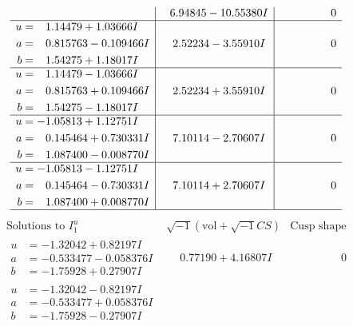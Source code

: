 \documentclass[1p]{elsarticle_modified}
\theoremstyle{definition}
\newcommand{\I}{\sqrt{-1}}
\begin{document}
$$\begin{array}{c|c|c}
 & \phantom{-}6.94845 - 10.55380 I & \phantom{-0.000000 } 0 \\ \hline\begin{aligned}
u &= \phantom{-}1.14479 + 1.03666 I \\
a &= \phantom{-}0.815763 - 0.109466 I \\
b &= \phantom{-}1.54275 + 1.18017 I\end{aligned}
 & \phantom{-}2.52234 - 3.55910 I & \phantom{-0.000000 } 0 \\ \hline\begin{aligned}
u &= \phantom{-}1.14479 - 1.03666 I \\
a &= \phantom{-}0.815763 + 0.109466 I \\
b &= \phantom{-}1.54275 - 1.18017 I\end{aligned}
 & \phantom{-}2.52234 + 3.55910 I & \phantom{-0.000000 } 0 \\ \hline\begin{aligned}
u &= -1.05813 + 1.12751 I \\
a &= \phantom{-}0.145464 + 0.730331 I \\
b &= \phantom{-}1.087400 - 0.008770 I\end{aligned}
 & \phantom{-}7.10114 - 2.70607 I & \phantom{-0.000000 } 0 \\ \hline\begin{aligned}
u &= -1.05813 - 1.12751 I \\
a &= \phantom{-}0.145464 - 0.730331 I \\
b &= \phantom{-}1.087400 + 0.008770 I\end{aligned}
 & \phantom{-}7.10114 + 2.70607 I & \phantom{-0.000000 } 0\\
 \hline 
 \end{array}$$\newpage$$\begin{array}{c|c|c}  
\text{Solutions to }I^u_{1}& \I (\text{vol} + \sqrt{-1}CS) & \text{Cusp shape}\\
 \hline 
\begin{aligned}
u &= -1.32042 + 0.82197 I \\
a &= -0.533477 - 0.058376 I \\
b &= -1.75928 + 0.27907 I\end{aligned}
 & \phantom{-}0.77190 + 4.16807 I & \phantom{-0.000000 } 0 \\ \hline\begin{aligned}
u &= -1.32042 - 0.82197 I \\
a &= -0.533477 + 0.058376 I \\
b &= -1.75928 - 0.27907 I\end{aligned}

\end{array}$$
\end{document}
